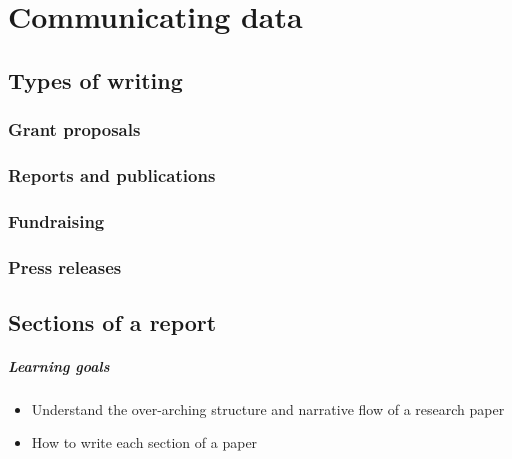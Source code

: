 \documentclass[
]{book}
\providecommand{\tightlist}{%
  \setlength{\itemsep}{0pt}\setlength{\parskip}{0pt}}
\begin{document}
\hypertarget{part-communicating-data}{%
\part{Communicating data}\label{part-communicating-data}}

\hypertarget{types-of-writing}{%
\chapter{Types of writing}\label{types-of-writing}}

\hypertarget{grant-proposals}{%
\section*{Grant proposals}\label{grant-proposals}}

\hypertarget{reports-and-publications}{%
\section*{Reports and publications}\label{reports-and-publications}}

\hypertarget{fundraising}{%
\section*{Fundraising}\label{fundraising}}

\hypertarget{press-releases}{%
\section*{Press releases}\label{press-releases}}

\hypertarget{sections-of-a-report}{%
\chapter{Sections of a report}\label{sections-of-a-report}}

\hypertarget{learning-goals-17}{%
\subsubsection*{Learning goals}\label{learning-goals-17}}

\begin{itemize}
\tightlist
\item
  Understand the over-arching structure and narrative flow of a research paper\\
\item
  How to write each section of a paper
\end{itemize}
\end{document}
